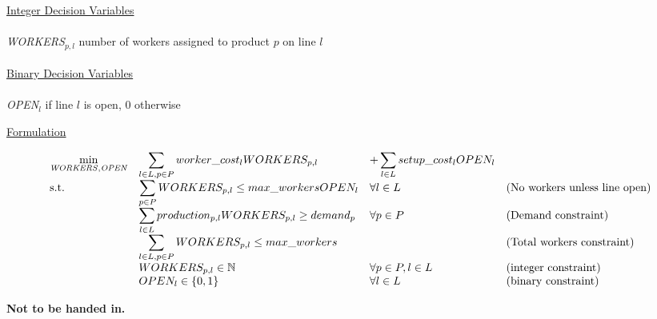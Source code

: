 \documentclass[10pt]{article}
\begin{document}
\begin{enumerate}
\begin{tabbing}
\noindent\underline{Integer Decision Variables}\\%
\\
\> {\it WORKERS}$_{p,l}$ \> number of workers assigned to product $p$ on line $l$  \\
\\
\noindent\underline{Binary Decision Variables}\\%
\\
\> {\it OPEN}$_{l}$  if line $l$ is open, 0 otherwise  \\
\end{tabbing}


\noindent\underline{Formulation}

 \[
    \begin{array}{llll}
      \displaystyle\min_{ \tiny{\it WORKERS, OPEN}} & \displaystyle\sum_{l\in L,p\in P} worker\_cost_{l} WORKERS_{p,l} & + \displaystyle\sum_{l\in L} setup\_cost_l OPEN_l & \\
      \mbox{s.t.} & \displaystyle\sum_{p\in P} WORKERS_{p,l} \le max\_workers OPEN_l &  \forall l \in L & {\rm (No~workers~unless~line~open)}\\
& \displaystyle\sum_{l \in L} production_{p,l} WORKERS_{p,l} \ge demand_p &  \forall p \in P & {\rm (Demand~constraint)}\\
& \displaystyle\sum_{l \in L,p \in P} WORKERS_{p,l} \le max\_workers &  & {\rm (Total~workers~constraint)}\\
& WORKERS_{p,l} \in {\mathbb N} &\forall p\in P, l \in L  & {\rm (integer~constraint)}\\
& OPEN_{l} \in \{0,1\} & \forall l\in L & {\rm (binary~constraint)}\\
    \end{array}
    \]

\end{enumerate}

\newpage

{\bf Not to be handed in.}

\medskip
\end{document}

